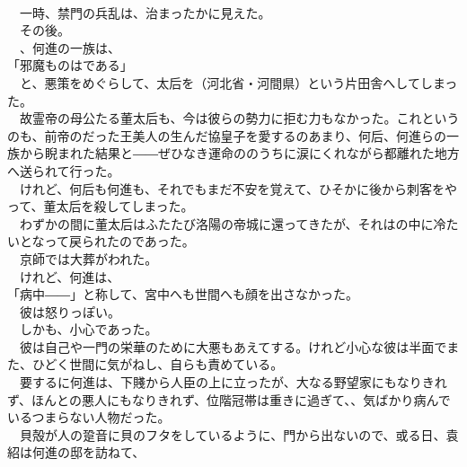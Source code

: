 \documentclass[
  paper=a5,
  fontsize=10pt,
  jafontsize=9.5pt,
  tate,                  %
  open_bracket_pos=nibu, %
]{jlreq}
\begin{document}
\\


　一時、禁門の兵乱は、治まったかに見えた。\\


　その後。\\


　、何進の一族は、\\


「邪魔ものはである」\\


　と、悪策をめぐらして、太后を（河北省・河間県）という片田舎へしてしまった。\\


　故霊帝の母公たる董太后も、今は彼らの勢力に拒む力もなかった。これというのも、前帝のだった王美人の生んだ協皇子を愛するのあまり、何后、何進らの一族から睨まれた結果と――ぜひなき運命ののうちに涙にくれながら都離れた地方へ送られて行った。\\


　けれど、何后も何進も、それでもまだ不安を覚えて、ひそかに後から刺客をやって、董太后を殺してしまった。\\


　わずかの間に董太后はふたたび洛陽の帝城に還ってきたが、それはの中に冷たいとなって戻られたのであった。\\


　京師では大葬がわれた。\\


　けれど、何進は、\\


「病中――」と称して、宮中へも世間へも顔を出さなかった。\\


　彼は怒りっぽい。\\


　しかも、小心であった。\\


　彼は自己や一門の栄華のために大悪もあえてする。けれど小心な彼は半面でまた、ひどく世間に気がねし、自らも責めている。\\


　要するに何進は、下賤から人臣の上に立ったが、大なる野望家にもなりきれず、ほんとの悪人にもなりきれず、位階冠帯は重きに過ぎて、、気ばかり病んでいるつまらない人物だった。\\


　貝殻が人の跫音に貝のフタをしているように、門から出ないので、或る日、袁紹は何進の邸を訪ねて、\\
\end{document}
